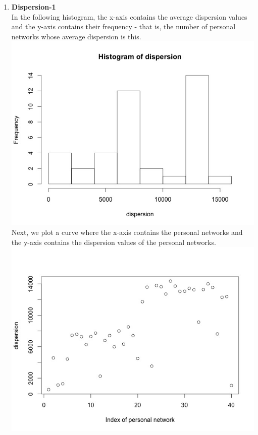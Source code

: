 \documentclass{article}
\begin{document}
\begin{enumerate}
 \item \textbf{Dispersion-1}\\
 In the following histogram, the x-axis contains the average dispersion values and the y-axis contains their
 frequency - that is, the number of personal networks whose average dispersion is this.\\
 \includegraphics[scale=0.4]{5-c} \\
 Next, we plot a curve where the x-axis contains the personal networks and the y-axis contains the dispersion
 values of the personal networks.\\
 \includegraphics[scale=0.4]{5-d} \\


\end{enumerate}
\end{document}
